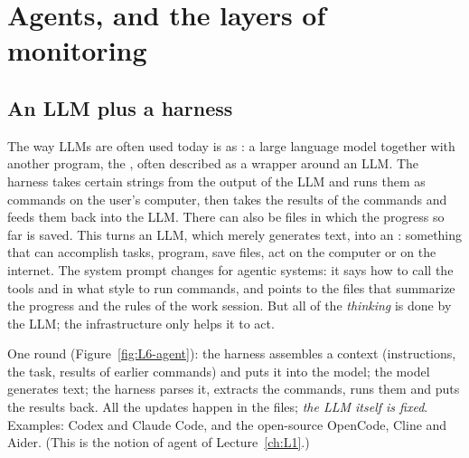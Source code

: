 \section{Agents, and the layers of monitoring}\label{sec:L6-agents}
\subsection{An LLM plus a harness}\label{sec:L6-harness}
The way LLMs are often used today is as : a large language model together with another program, the , often described as a wrapper around an LLM. The harness takes certain strings from the output of the LLM and runs them as commands on the user's computer, then takes the results of the commands and feeds them back into the LLM. There can also be files in which the progress so far is saved. This turns an LLM, which merely generates text, into an : something that can accomplish tasks, program, save files, act on the computer or on the internet. The system prompt changes for agentic systems: it says how to call the tools and in what style to run commands, and points to the files that summarize the progress and the rules of the work session. But all of the \emph{thinking} is done by the LLM; the infrastructure only helps it to act.

One round (Figure~\ref{fig:L6-agent}): the harness assembles a context (instructions, the task, results of earlier commands) and puts it into the model; the model generates text; the harness parses it, extracts the commands, runs them and puts the results back. All the updates happen in the files; \emph{the LLM itself is fixed}. Examples: Codex and Claude Code, and the open-source OpenCode, Cline and Aider. (This is the notion of agent of Lecture~\ref{ch:L1}.)

